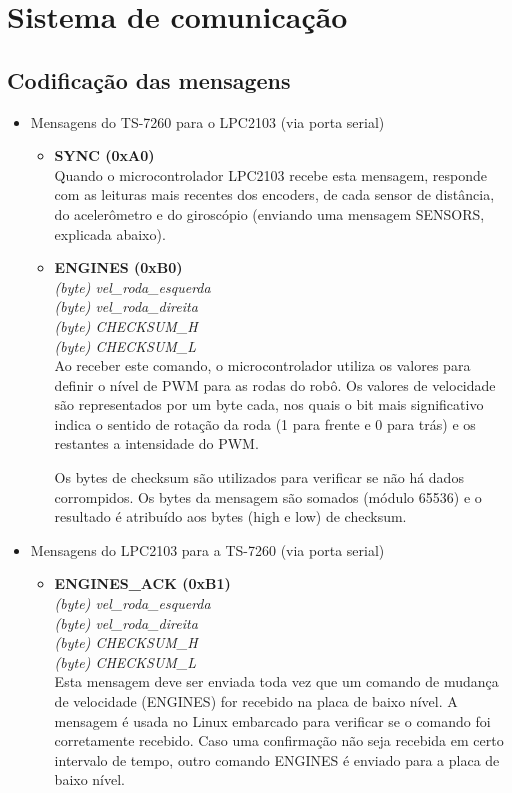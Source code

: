 \section{Sistema de comunicação}
\subsection{Codificação das mensagens}
\label{sec:codificacao_mensagens}

\begin{itemize}
  \item Mensagens do TS-7260 para o LPC2103 (via porta serial)
    	
	\begin{itemize}
		
	  \item \textbf{SYNC (0xA0)}\\
	  Quando o microcontrolador LPC2103 recebe esta mensagem, responde com as leituras mais recentes dos encoders, de cada sensor de distância, do acelerômetro e do giroscópio (enviando uma mensagem SENSORS, explicada abaixo).
	  
	  \item \textbf{ENGINES (0xB0)}\\
	  \textit{(byte) vel\_roda\_esquerda}\\
	  \textit{(byte) vel\_roda\_direita}\\
	  \textit{(byte) CHECKSUM\_H}\\
	  \textit{(byte) CHECKSUM\_L}\\
	  Ao receber este comando, o microcontrolador utiliza os valores para definir o nível de PWM para as rodas do robô. Os valores de velocidade são representados por um byte cada, nos quais o bit mais significativo indica o sentido de rotação da roda (1 para frente e 0 para trás) e os restantes a intensidade do PWM.
	  
	  Os bytes de checksum são utilizados para verificar se não há dados corrompidos. Os bytes da mensagem são somados (módulo 65536) e o resultado é atribuído aos bytes (high e low) de checksum.
	  \end{itemize}
	  
	  \item Mensagens do LPC2103 para a TS-7260 (via porta serial)
	  
	  \begin{itemize}

	  \item \textbf{ENGINES\_ACK (0xB1)}\\
	  \textit{(byte) vel\_roda\_esquerda}\\
	  \textit{(byte) vel\_roda\_direita}\\
	  \textit{(byte) CHECKSUM\_H}\\
	  \textit{(byte) CHECKSUM\_L}\\
	  Esta mensagem deve ser enviada toda vez que um comando de mudança de velocidade (ENGINES) for recebido na placa de baixo nível. A mensagem é usada no Linux embarcado para verificar se o comando foi corretamente recebido. Caso uma confirmação não seja recebida em certo intervalo de tempo, outro comando ENGINES é enviado para a placa de baixo nível.
	 

\end{itemize}
\end{itemize}
